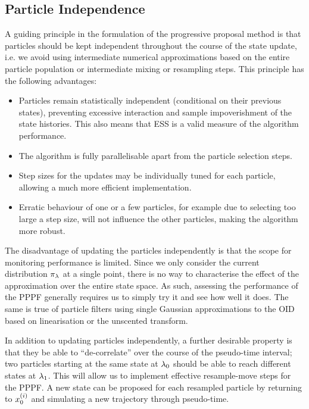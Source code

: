 \documentclass{article}
\begin{document}
\subsection{Particle Independence} \label{sec:particle_independence}

A guiding principle in the formulation of the progressive proposal method is that particles should be kept independent throughout the course of the state update, i.e. we avoid using intermediate numerical approximations based on the entire particle population or intermediate mixing or resampling steps. This principle has the following advantages:
%
\begin{itemize}
  \item Particles remain statistically independent (conditional on their previous states), preventing excessive interaction and sample impoverishment of the state histories. This also means that ESS is a valid measure of the algorithm performance.
  \item The algorithm is fully parallelisable apart from the particle selection steps.
  \item Step sizes for the updates may be individually tuned for each particle, allowing a much more efficient implementation.
  \item Erratic behaviour of one or a few particles, for example due to selecting too large a step size, will not influence the other particles, making the algorithm more robust.
\end{itemize}

The disadvantage of updating the particles independently is that the scope for monitoring performance is limited. Since we only consider the current distribution $\pi_{\lambda}$ at a single point, there is no way to characterise the effect of the approximation over the entire state space. As such, assessing the performance of the PPPF generally requires us to simply try it and see how well it does. The same is true of particle filters using single Gaussian approximations to the OID based on linearisation or the unscented transform.

In addition to updating particles independently, a further desirable property is that they be able to ``de-correlate'' over the course of the pseudo-time interval; two particles starting at the same state at $\lambda_0$ should be able to reach different states at $\lambda_1$. This will allow us to implement effective resample-move steps for the PPPF. A new state can be proposed for each resampled particle by returning to $x_{0}^{(i)}$ and simulating a new trajectory through pseudo-time.
\end{document}
